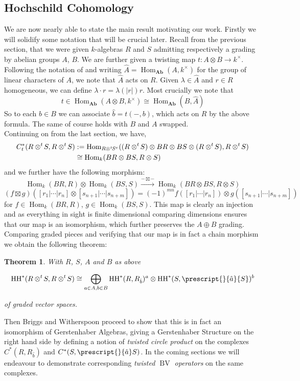 \documentclass{article}
\newcommand{\HH}{\operatorname{HH}}
\newcommand{\twisten}{\otimes^t\hspace{-1pt}}
\newcommand{\homo}{\operatorname{Hom}}
\newcommand{\bv}{\operatorname{BV}}
\newcommand{\els}{[s_{n+1} | \cdots |s_{n+m}]}
\theoremstyle{plain}
\newtheorem{theorem}{Theorem}
\theoremstyle{definition}
\begin{document}
\subsection{Hochschild Cohomology}
We are now nearly able to state the main result motivating our work. Firstly we will solidify some notation that will be crucial later. Recall from the previous section, that we were given $k$-algebras $R$ and $S$ admitting respectively a grading by abelian groups $A$, $B$. We are further given a twisting map $t: A \otimes B \rightarrow k^{\times}$. Following the notation of \cite{BriggsWitherspoon} and writing $\hat{A} = \homo_{\textbf{Ab}} (A, k^\times)$ for the group of linear characters of $A$, we note that $\hat{A}$ acts on $R$. Given $\lambda \in \hat{A}$ and $r \in R$ homogeneous, we can define $\lambda \cdot r = \lambda(|r|) r$. Most crucially we note that
$$t \in \homo_{\textbf{Ab}}(A \otimes B, k^{\times}) \cong \homo_{\textbf{Ab}}(B, \hat{A})$$
So to each $b \in B$ we can associate $\hat{b} = t(-,b)$, which acts on $R$ by the above formula. The same of course holds with $B$ and $A$ swapped. \\

Continuing on from the last section, we have, 
$$\begin{aligned} C_t^*(R \twisten S, R \twisten S) &:=  \homo_{R \twisten S ^e} ( (R \twisten S) \otimes BR \otimes BS \otimes (R \twisten S), R \twisten S)\\& \cong \homo_k(BR \otimes BS, R \otimes S)\end{aligned}$$
and we further have the following morphism:
$$\homo_k(BR, R) \otimes \homo_k(BS, S) \xrightarrow{- \boxtimes -} \homo_k(BR \otimes BS, R \otimes S)$$
$$(f \boxtimes g)([r_1 | \cdots | r_n] \otimes \els) =(-1)^{mn}f([r_1 | \cdots | r_n]) \otimes g(\els)$$
for $f \in \homo_k (BR, R)$, $g \in \homo_k(BS, S)$. This map is clearly an injection and as everything in sight is finite dimensional comparing dimensions ensures that our map is an isomorphism, which further preserves the $A \oplus B$ grading. Comparing graded pieces and verifying that our map is in fact a chain morphism \cite{BriggsWitherspoon} we obtain the following theorem:
\begin{theorem}\label{TwistedTensorTheorem} With $R$, $S$, $A$ and $B$ as above

$$\HH^*(R \twisten S, R \twisten S) \cong \bigoplus_{a \in A, b \in B} \HH^*(R, R_{\hat{b}})^a \otimes \HH^*(S, \prescript{}{\hat{a}}{S})^b$$

of graded vector spaces.
\end{theorem}
Then Briggs and Witherspoon proceed to show that this is in fact an isomorphism of Gerstenhaber Algebras, giving a Gerstenhaber Structure on the right hand side by defining a notion of \emph{twisted circle product} on the complexes $C^*(R,R_{\hat{b}})$ and $C^*(S, \prescript{}{\hat{a}}S)$. In the coming sections we will endeavour to demonstrate corresponding \emph{twisted $\bv$ operators} on the same complexes. 
\end{document}
